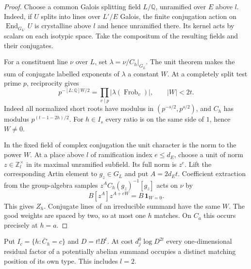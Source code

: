 \begin{proof}
Choose a common Galois splitting field $L/\mathbb Q$, unramified over
$E$ above $l$. Indeed, if $U$ splits into lines over $L'/E$ Galois,
the finite conjugation action on $\operatorname{End}_{G_{L'}}U$ is
crystalline above $l$ and hence unramified there. Its kernel acts by
scalars on each isotypic space. Take the compositum of the resulting
fields and their conjugates.

For a constituent line $\nu$ over $L$, set $\lambda=\nu/C_h|_{G_L}$.
The unit theorem makes the sum of conjugate labelled exponents of
$\lambda$ a constant $W$. At a completely split test prime $p$,
reciprocity gives
\[
 p^{-[L:\mathbb Q]W/2}
    =\prod_{v\mid p}|\lambda(\operatorname{Frob}_v)|,\qquad |W|<2t .
\]
Indeed all normalized short roots have modulus in
$(p^{-s/2},p^{s/2})$, and $C_h$ has modulus $p^{(t-1-2h)/2}$.
For $h\in I_s$ every ratio is on the same side of $1$, hence $W\ne0$.

In the fixed field of complex conjugation the unit character is the
norm to the power $W$. At a place above $l$ of ramification index
$e\le d_E$, choose a unit of norm $z\in\mathbb Z_l^\times$ in its
maximal unramified subfield. Its full norm is $z^e$. Lift the
corresponding Artin element to $g_z\in G_L$ and put $A=2d_Et$.
Coefficient extraction from the group-algebra samples
$z^AC_h(g_z)^{-1}[g_z]$ acts on $\nu$ by
\[
 B[z^A]z^{A+eW}=B\,\mathbf1_{W=0}.
\]
This gives $Z_h$. Conjugate lines of an irreducible summand have the
same $W$. The good weights are spaced by two, so at most one $h$
matches. On $C_a$ this occurs precisely at $h=a$.
\end{proof}

\begin{twistedtest}\label{lem:twisted-multiplicities}
Put $I_c=\{h:\bar C_h=c\}$ and $D=t!B^t$. At cost
$d_j^0\log D^{2t}$ every one-dimensional residual factor of a
potentially abelian summand occupies a distinct matching position
of its own type. This includes $l=2$.
\end{twistedtest}

